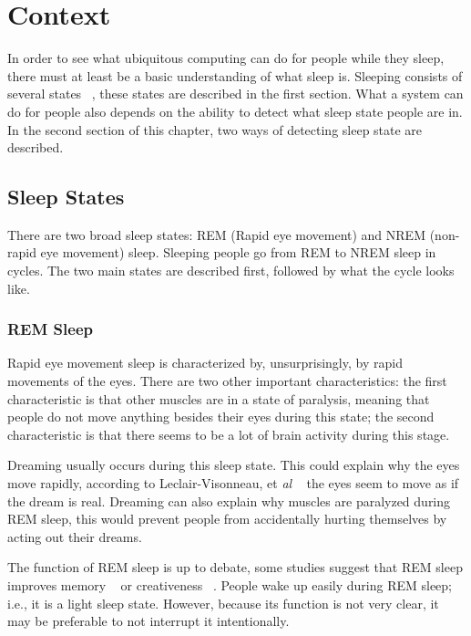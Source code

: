 \chapter{Context} %
\label{cha:context}
In order to see what ubiquitous computing can do for people while they sleep, there must at least be a basic understanding of what sleep is. Sleeping consists of several states ~\cite{Silber:2007fk}, these states are described in the first section. What a system can do for people also depends on the ability to detect what sleep state people are in. In the second section of this chapter, two ways of detecting sleep state are described.
 
\section{Sleep States} %
\label{sec:sleep_states}
There are two broad sleep states: REM (Rapid eye movement) and NREM (non-rapid eye movement) sleep. Sleeping people go from REM to NREM sleep in cycles. The two main states are described first, followed by what the cycle looks like.

\subsection{REM Sleep} %
\label{sub:rem_sleep}
Rapid eye movement sleep is characterized by, unsurprisingly, by rapid movements of the eyes. There are two other important characteristics: the first characteristic is that other muscles are in a state of paralysis, meaning that people do not move anything besides their eyes during this state; the second characteristic is that there seems to be a lot of brain activity during this stage.

Dreaming usually occurs during this sleep state. This could explain why the eyes move rapidly, according to Leclair-Visonneau, et \emph{al} ~\cite{LeclairVisonneau:2010:Brain:20478849} the eyes seem to move as if the dream is real. Dreaming can also explain why muscles are paralyzed during REM sleep, this would prevent people from accidentally hurting themselves by acting out their dreams.

The function of REM sleep is up to debate, some studies suggest that REM sleep improves memory ~\cite{Marshall:2006:Nature:17086200} or creativeness ~\cite{Wagner:2004:Nature:14737168}. People wake up easily during REM sleep; i.e., it is a light sleep state. However, because its function is not very clear, it may be preferable to not interrupt it intentionally.


